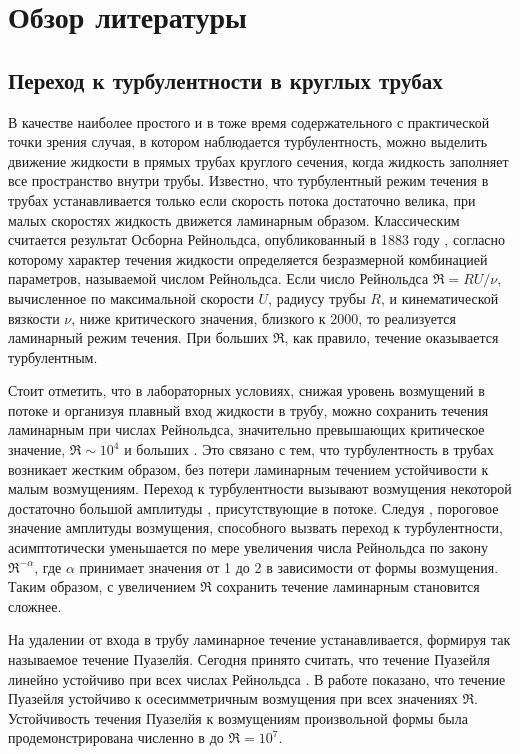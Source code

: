 \section{Обзор литературы}

	\subsection{Переход к турбулентности в круглых трубах}

В качестве наиболее простого и в тоже время содержательного с практической точки зрения случая, в котором наблюдается турбулентность, можно выделить движение жидкости в прямых трубах круглого сечения, когда жидкость заполняет все пространство внутри трубы. Известно, что турбулентный режим течения в трубах устанавливается только если скорость потока достаточно велика, при малых скоростях жидкость движется ламинарным образом. Классическим считается результат Осборна Рейнольдса, опубликованный в 1883 году \cite{Reynolds1883}, согласно которому характер течения жидкости определяется безразмерной комбинацией параметров, называемой числом Рейнольдса. Если число Рейнольдса $\Re = RU/\nu$, вычисленное по максимальной скорости $U$, радиусу трубы $R$, и кинематической вязкости $\nu$, ниже критического значения, близкого к $2000$, то реализуется ламинарный режим течения. При больших $\Re$, как правило, течение оказывается турбулентным. 

Стоит отметить, что в лабораторных условиях, снижая уровень возмущений в потоке и организуя плавный вход жидкости в трубу, можно сохранить течения ламинарным при числах Рейнольдса, значительно превышающих критическое значение, $\Re \sim 10^4$ и больших \cite{Wygnanski1973, Darbyshire1995, vanDoorne2009}. Это связано с тем, что турбулентность в трубах возникает жестким образом, без потери ламинарным течением устойчивости к малым возмущениям. Переход к турбулентности вызывают возмущения некоторой достаточно большой амплитуды \cite{Grossmann2000}, присутствующие в потоке. Следуя \cite{Darbyshire1995, Hof2003, Peixinho2007, Mellibovsky2009critical}, пороговое значение амплитуды возмущения, способного вызвать переход к турбулентности, асимптотически уменьшается по мере увеличения числа Рейнольдса по закону $\Re^{-\alpha}$, где $\alpha$ принимает значения от 1 до 2 в зависимости от формы возмущения. Таким образом, с увеличением $\Re$ сохранить течение ламинарным становится сложнее. 

На удалении от входа в трубу ламинарное течение устанавливается, формируя так называемое течение Пуазелйя. Сегодня принято считать, что течение Пуазейля линейно устойчиво при всех числах Рейнольдса \cite{Kerswell2005}. В работе \cite{Salwen1980} показано, что течение Пуазейля устойчиво к осесимметричным возмущения при всех значениях $\Re$. Устойчивость течения Пуазелйя к возмущениям произвольной формы была продемонстрирована численно в \cite{Meseguer2003} до $\Re = 10^7$. 

